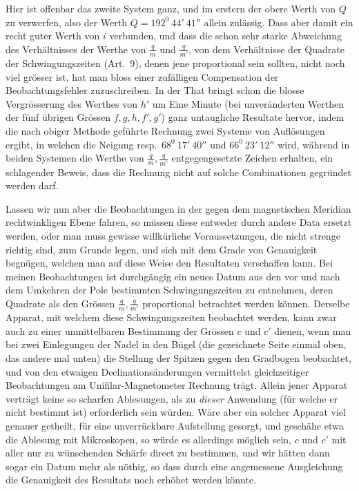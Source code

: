 Hier ist offenbar das zweite System ganz, und im erstern der obere Werth von $Q$ zu verwerfen, also der Werth $Q=192^0\ 44'\ 41''$ allein zulässig. Dass aber damit ein recht guter Werth von $i$ verbunden, und dass die schon sehr starke Abweichung des Verhältnisses der Werthe von $\frac{q}{m}$ und $\frac{q}{m'}$, von dem Verhältnisse der Quadrate der Schwingungszeiten (Art.\ 9), denen jene proportional sein sollten, nicht noch viel grösser ist, hat man bloss einer zufälligen Compensation der Beobachtungsfehler zuzuschreiben. In der That bringt schon die blosse Vergrösserung des Werthes von $h'$ um Eine Minute (bei unveränderten Werthen
der fünf übrigen Grössen $f,g,h,f',g'$) ganz untaugliche Resultate hervor, indem die nach obiger Methode geführte Rechnung zwei Systeme von Auflösungen ergibt, in welchen die Neigung resp.\ $68^0\ 17'\ 40''$ und $66^0\ 23'\ 12''$ wird, während in beiden Systemen die Werthe von $\frac{q}{m},\frac{q}{m'}$ entgegengesetzte Zeichen erhalten, ein schlagender Beweis, dass die Rechnung nicht auf solche Combinationen gegründet werden darf.

Lassen wir nun aber die Beobachtungen in der gegen dem magnetischen Meridian rechtwinkligen Ebene fahren, so müssen diese entweder durch andere Data ersetzt werden, oder man muss gewisse willkürliche Voraussetzungen, die nicht strenge richtig sind, zum Grunde legen, und sich mit dem Grade von Genauigkeit begnügen, welchen man auf diese Weise den Resultaten verschaffen kann. Bei meinen Beobachtungen ist durchgängig ein neues Datum aus den vor und nach dem Umkehren der Pole bestimmten Schwingungszeiten zu entnehmen, deren Quadrate als den Grössen $\frac{q}{m},\frac{q}{m'}$ proportional betrachtet werden können. Derselbe Apparat, mit welchem diese Schwingungszeiten beobachtet werden, kann zwar auch zu einer unmittelbaren Bestimmung der Grössen $c$ und $c'$ dienen, wenn man bei zwei Einlegungen der Nadel in den Bügel (die gezeichnete Seite einmal oben, das andere mal unten) die Stellung der Spitzen gegen den Gradbogen beobachtet, und von den etwaigen Declinationsänderungen vermittelst gleichzeitiger Beobachtungen am Unifilar-Magnetometer Rechnung trägt. Allein jener Apparat verträgt keine so scharfen Ablesungen, als zu \textit{dieser} Anwendung (für welche er nicht bestimmt ist) erforderlich sein würden. Wäre aber ein solcher Apparat viel genauer getheilt, für eine unverrückbare Aufstellung gesorgt, und geschähe etwa die Ablesung mit Mikroskopen, so würde es allerdings möglich sein, $c$ und $c'$ mit aller nur zu wünschenden Schärfe direct zu bestimmen, und wir hätten dann sogar ein Datum mehr als nöthig, so dass durch eine angemessene Ausgleichung die Genauigkeit des Resultats noch erhöhet werden könnte.

